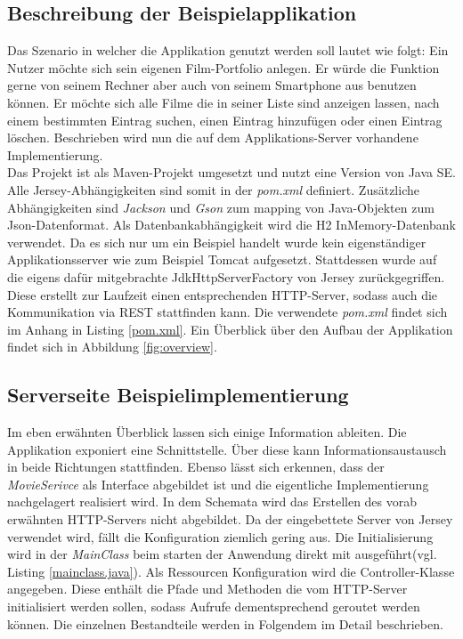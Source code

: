 \documentclass[fleqn,10.5pt,ngerman]{SelfArx}
\begin{document}
\subsection{Beschreibung der Beispielapplikation}
Das Szenario in welcher die Applikation genutzt werden soll lautet wie folgt: Ein Nutzer möchte sich sein eigenen Film-Portfolio anlegen. Er würde die Funktion gerne von seinem Rechner aber auch von seinem Smartphone aus benutzen können. Er möchte sich alle Filme die in seiner Liste sind anzeigen lassen, nach einem bestimmten Eintrag suchen, einen Eintrag hinzufügen oder einen Eintrag löschen. Beschrieben wird nun die auf dem Applikations-Server vorhandene Implementierung. \\ Das Projekt ist als Maven-Projekt umgesetzt und nutzt eine Version von Java SE. Alle Jersey-Abhängigkeiten sind somit in der \textit{pom.xml} definiert. Zusätzliche Abhängigkeiten sind \textit{Jackson} und \textit{Gson} zum mapping von Java-Objekten zum Json-Datenformat. Als Datenbankabhängigkeit wird die H2 InMemory-Datenbank verwendet. Da es sich nur um ein Beispiel handelt wurde kein eigenständiger Applikationsserver wie zum Beispiel Tomcat aufgesetzt. Stattdessen wurde auf die eigens dafür mitgebrachte JdkHttpServerFactory von Jersey zurückgegriffen. Diese erstellt zur Laufzeit einen entsprechenden HTTP-Server, sodass auch die Kommunikation via REST stattfinden kann. Die verwendete \textit{pom.xml} findet sich im Anhang in Listing \ref{pom.xml}.
Ein Überblick über den Aufbau der Applikation findet sich in Abbildung \ref{fig:overview}.
\subsection{Serverseite Beispielimplementierung}
Im eben erwähnten Überblick lassen sich einige Information ableiten. Die Applikation exponiert eine Schnittstelle. Über diese kann Informationsaustausch in beide Richtungen stattfinden. Ebenso lässt sich erkennen, dass der \textit{MovieSerivce} als Interface abgebildet ist und die eigentliche Implementierung nachgelagert realisiert wird. In dem Schemata wird das Erstellen des vorab erwähnten HTTP-Servers nicht abgebildet. Da der eingebettete Server von Jersey verwendet wird, fällt die Konfiguration ziemlich gering aus. Die Initialisierung wird in der \textit{MainClass} beim starten der Anwendung direkt mit ausgeführt(vgl. Listing \ref{mainclass.java}). Als Ressourcen Konfiguration wird die Controller-Klasse angegeben. Diese enthält die Pfade und Methoden die vom HTTP-Server initialisiert werden sollen, sodass Aufrufe dementsprechend geroutet werden können. Die einzelnen Bestandteile werden in Folgendem im Detail beschrieben.

\end{document}
